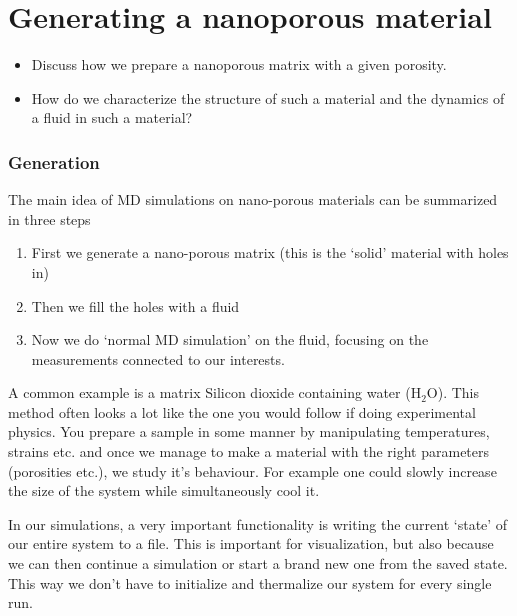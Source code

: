 \documentclass[a4paper, 11pt, notitlepage, english]{article}
\begin{document}
\clearpage



\section{Generating a nanoporous material}
\begin{itemize}
	\item Discuss how we prepare a nanoporous matrix with a given porosity.
	\item How do we characterize the structure of such a material and the dynamics of a fluid in such
a material?
\end{itemize}

\subsubsection*{Generation}
The main idea of MD simulations on nano-porous materials can be summarized in three steps
\begin{enumerate}
	\item First we generate a nano-porous matrix (this is the `solid' material with holes in)
	\item Then we fill the holes with a fluid
	\item Now we do `normal MD simulation' on the fluid, focusing on the measurements connected to our interests. 
\end{enumerate}
A common example is a matrix Silicon dioxide containing water (H$_2$O). This method often looks a lot like the one you would follow if doing experimental physics. You prepare a sample in some manner by manipulating temperatures, strains etc. and once we manage to make a material with the right parameters (porosities etc.), we study it's behaviour. For example one could slowly increase the size of the system while simultaneously cool it.

In our simulations, a very important functionality is writing the current `state' of our entire system to a file. This is important for visualization, but also because we can then continue a simulation or start a brand new one from the saved state. This way we don't have to initialize and thermalize our system for every single run. 
\end{document}
